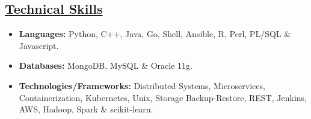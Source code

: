\documentclass[10pt]{article}
\begin{document}
\subsection*{\underline{Technical Skills}}
\vspace{-0.1cm}
\begin{itemize}[leftmargin=*]
 \item[]  \textbf{Languages:}  Python, C++, Java, Go, Shell, Ansible, R, Perl, PL/SQL \& Javascript.
 \vspace{-0.22cm}
 \item[]   \textbf{Databases:} MongoDB, MySQL \& Oracle 11g.
  \vspace{-0.22cm}
 \item[]   \textbf{Technologies/Frameworks:} Distributed Systems, Microservices, Containerization, Kubernetes, Unix, Storage Backup-Restore, REST, Jenkins, AWS, Hadoop, Spark \& scikit-learn.
\end{itemize}
\end{document}
